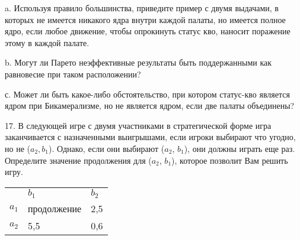 \documentclass[a4paper,12pt]{article}
\begin{document}
a. Используя правило большинства, приведите пример
с двумя выдачами, в которых не имеется никакого
ядра внутри каждой палаты, но имеется полное ядро,
если любое движение, чтобы опрокинуть статус кво,
наносит поражение этому в каждой палате.

b. Могут ли Парето неэффективные результаты быть
поддержанными как равновесие при таком
расположении?

с. Может ли быть какое-либо обстоятельство, при
котором статус-кво является ядром при
Бикамерализме, но не является ядром, если две
палаты объединены?

17. В следующей игре с двумя участниками в
стратегической форме игра заканчивается с
назначенными выигрышами, если игроки выбирают что
угодно, но не ($a_{2},b_{1}$). Однако, если они
выбирают ($a_{2}$, $b_{1}$), они должны играть еще
раз. Определите значение продолжения для ($a_{2}$,
$b_{1}$), которое позволит Вам решить игру.

\begin{tabular}{lll}
& $b_{1}$ & $b_{2}$ \\ \cline{2-3}
$a_{1}$ & \multicolumn{1}{|l}{продолжение} & \multicolumn{1}{|l|}{2,5} \\
\cline{2-3} $a_{2}$ & \multicolumn{1}{|l}{5,5} &
\multicolumn{1}{|l|}{0,6} \\ \cline{2-3}
\end{tabular}

%
%

\end{document}
